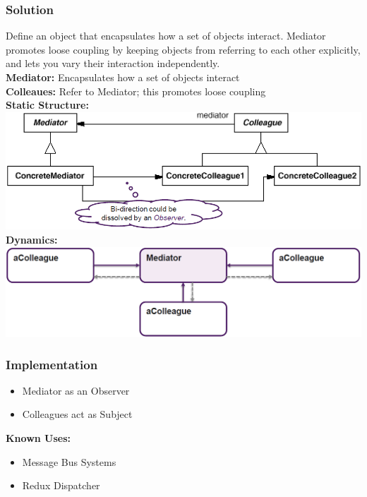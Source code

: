 \subsubsection{Solution}
Define an object that encapsulates how a set of objects interact. Mediator promotes loose coupling by keeping objects from referring to each other explicitly, and lets you vary their interaction independently.\\ 
\textbf{Mediator:} Encapsulates how a set of objects interact\\ 
\textbf{Colleaues:} Refer to Mediator; this promotes loose coupling\\ 
\textbf{Static Structure:}\\
\includegraphics[width=\linewidth]{./img/mediator_static.png}
\textbf{Dynamics:}\\ 
\includegraphics[width=\linewidth]{./img/mediator_dynamic.png}
\subsubsection{Implementation}
\begin{itemize}
    \item Mediator as an Observer
    \item Colleagues act as Subject
\end{itemize}
\textbf{Known Uses:}
\begin{itemize}
    \item Message Bus Systems
    \item Redux Dispatcher
\end{itemize}
